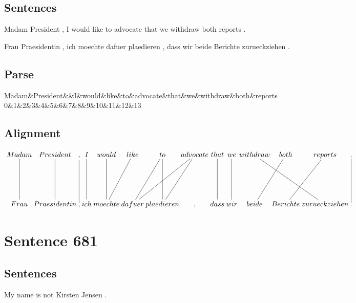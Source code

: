 \documentclass{report}
\begin{document}
\subsection*{Sentences}
Madam President , I would like to advocate that we withdraw both reports .

\noindent Frau Praesidentin , ich moechte dafuer plaedieren , dass wir beide Berichte zurueckziehen .



\subsection*{Parse}
\begin{dependency}[theme=simple]
\begin{deptext}[column sep=.5cm, row sep=.1ex]
Madam\&President\&\&I\&would\&like\&to\&advocate\&that\&we\&withdraw\&both\&reports\\
0\&1\&2\&3\&4\&5\&6\&7\&8\&9\&10\&11\&12\&13\\
\end{deptext}
\end{dependency}


\subsection*{Alignment}
\scriptsize{
$
\xymatrix@C-2.3pc{
Madam \ar @{-} [dd] & President \ar @{-} [dd] & , \ar @{-} [dd] & I \ar @{-} [dd] & would \ar @{-} [dd] & like \ar @{-} [ddl] & to \ar @{-} [dd] \ar @{-} [ddl] & advocate \ar @{-} [ddl] \ar @{-} [ddll] & that \ar @{-} [dd] & we \ar @{-} [dd] & withdraw \ar @{-} [ddrr] & both \ar @{-} [ddl] & reports \ar @{-} [ddl] & . \ar @{-} [dd]\\\\
Frau & Praesidentin & , & ich & moechte & dafuer & plaedieren & , & dass & wir & beide & Berichte & zurueckziehen & .
}$}
\newpage\section*{Sentence 681}

\subsection*{Sentences}
My name is not Kirsten Jensen .
\end{document}
